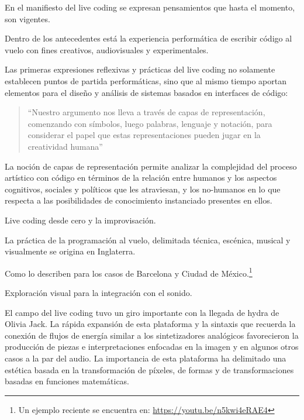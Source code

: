 En el manifiesto del live coding se expresan pensamientos que hasta el momento, son vigentes. 

Dentro de los antecedentes está la experiencia performática de escribir código al vuelo con fines creativos, audiovisuales y experimentales.

Las primeras expresiones reflexivas y prácticas del live coding no solamente establecen puntos de partida performáticas, sino que al mismo tiempo aportan elementos para el diseño y análisis de sistemas basados en interfaces de código:

\begin{quote}

  ``Nuestro argumento nos lleva a través de capas de representación, comenzando con símbolos, luego palabras, lenguaje y notación, para considerar el papel que estas representaciones pueden jugar en la creatividad humana'' \citep[p.~3]{McLean2011}

\end{quote}

La noción de capas de representación permite analizar la complejidad del proceso artístico con código en términos de la relación entre humanos y los aspectos cognitivos, sociales y políticos que les atraviesan, y los no-humanos en lo que respecta a las posibilidades de conocimiento instanciado presentes en ellos. 

Live coding desde cero y la improvisación. 


La práctica de la programación al vuelo, delimitada técnica, escénica, musical y visualmente se origina en Inglaterra. %

Como lo describen \cite{villasenor} para los casos de Barcelona y Ciudad de México.\footnote{Un ejemplo reciente se encuentra en: \url{https://youtu.be/n5kwi4eRAE4}} 


Exploración visual para la integración con el sonido.  
  
El campo del live coding tuvo un giro importante con la llegada de hydra de Olivia Jack. La rápida expansión de esta plataforma y la sintaxis que recuerda la conexión de flujos de energía similar a los sintetizadores analógicos favorecieron la producción de piezas e interpretaciones enfocadas en la imagen y en algunos otros casos a la par del audio. La importancia de esta plataforma ha delimitado una estética  basada en  la transformación de píxeles, de formas y de transformaciones basadas en funciones matemáticas.

